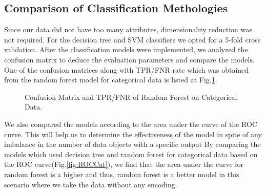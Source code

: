 \documentclass{article} %
\begin{document}
	\subsection{Comparison of Classification Methologies}
		Since our data did not have too many attributes, dimensionality reduction was not required. For the decision tree and SVM classifiers we opted for a 5-fold cross validation.
	After the classification models were implemented, we analyzed the confusion matrix to deduce the evaluation parameters and compare the models. One of the confusion matrices along with TPR/FNR rate which was obtained from the random forest model for categorical data is listed at Fig.\ref{fig:RFCM}. 
	
	\begin{figure}[h]
		\begin{center}
		\end{center}
		\caption{Confusion Matrix and TPR/FNR of Random Forest on Categorical Data.}
		\label{fig:RFCM}
	\end{figure}
	

	We also compared the models according to the area under the curve of the ROC curve. This will help us to determine the effectiveness of the model in spite of any imbalance in the number of data objects with a specific output
	By comparing the models which used decision tree and random forest for categorical data based on the ROC curve(Fig.\ref{fig:ROCCat}), we find that the area under the curve for random forest is a higher and thus, random forest is a better model in this scenario where we take the data without any encoding.
	
\end{document}
